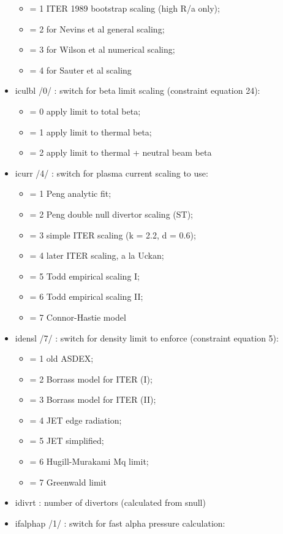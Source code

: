 \documentclass[]{article}
\begin{document}
\begin{itemize}
  \begin{itemize}
  \itemsep1pt\parskip0pt
  \item
    = 1 ITER 1989 bootstrap scaling (high R/a only);
  \item
    = 2 for Nevins et al general scaling;
  \item
    = 3 for Wilson et al numerical scaling;
  \item
    = 4 for Sauter et al scaling
  \end{itemize}
\item
  iculbl /0/ : switch for beta limit scaling (constraint equation 24):

  \begin{itemize}
  \itemsep1pt\parskip0pt
  \item
    = 0 apply limit to total beta;
  \item
    = 1 apply limit to thermal beta;
  \item
    = 2 apply limit to thermal + neutral beam beta
  \end{itemize}
\item
  icurr /4/ : switch for plasma current scaling to use:

  \begin{itemize}
  \itemsep1pt\parskip0pt
  \item
    = 1 Peng analytic fit;
  \item
    = 2 Peng double null divertor scaling (ST);
  \item
    = 3 simple ITER scaling (k = 2.2, d = 0.6);
  \item
    = 4 later ITER scaling, a la Uckan;
  \item
    = 5 Todd empirical scaling I;
  \item
    = 6 Todd empirical scaling II;
  \item
    = 7 Connor-Hastie model
  \end{itemize}
\item
  idensl /7/ : switch for density limit to enforce (constraint equation
  5):

  \begin{itemize}
  \itemsep1pt\parskip0pt
  \item
    = 1 old ASDEX;
  \item
    = 2 Borrass model for ITER (I);
  \item
    = 3 Borrass model for ITER (II);
  \item
    = 4 JET edge radiation;
  \item
    = 5 JET simplified;
  \item
    = 6 Hugill-Murakami Mq limit;
  \item
    = 7 Greenwald limit
  \end{itemize}
\item
  idivrt : number of divertors (calculated from snull)
\item
  ifalphap /1/ : switch for fast alpha pressure calculation:


\end{itemize}
\end{document}
